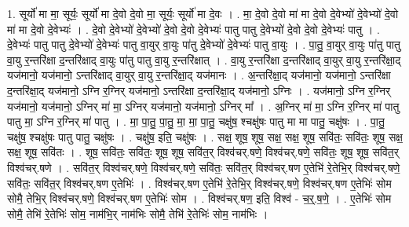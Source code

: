 \documentclass[17pt]{extarticle}
\begin{document}
1. सूर्यो॑ मा मा॒ सूर्यः॒ सूर्यो॑ मा दे॒वो दे॒वो मा॒ सूर्यः॒ सूर्यो॑ मा दे॒वः । . मा॒ दे॒वो दे॒वो मा॑ मा दे॒वो दे॒वेभ्यो॑ दे॒वेभ्यो॑ दे॒वो मा॑ मा दे॒वो दे॒वेभ्यः॑ । . दे॒वो दे॒वेभ्यो॑ दे॒वेभ्यो॑ दे॒वो दे॒वो दे॒वेभ्यः॑ पातु पातु दे॒वेभ्यो॑ दे॒वो दे॒वो दे॒वेभ्यः॑ पातु । . दे॒वेभ्यः॑ पातु पातु दे॒वेभ्यो॑ दे॒वेभ्यः॑ पातु वा॒युर् वा॒युः पा॑तु दे॒वेभ्यो॑ दे॒वेभ्यः॑ पातु वा॒युः । . पा॒तु॒ वा॒युर् वा॒युः पा॑तु पातु वा॒यु र॒न्तरि॑क्षा द॒न्तरि॑क्षाद् वा॒युः पा॑तु पातु वा॒यु र॒न्तरि॑क्षात् । . वा॒यु र॒न्तरि॑क्षा द॒न्तरि॑क्षाद् वा॒युर् वा॒यु र॒न्तरि॑क्षा॒द् यज॑मानो॒ यज॑मानो॒ ऽन्तरि॑क्षाद् वा॒युर् वा॒यु र॒न्तरि॑क्षा॒द् यज॑मानः । . अ॒न्तरि॑क्षा॒द् यज॑मानो॒ यज॑मानो॒ ऽन्तरि॑क्षा द॒न्तरि॑क्षा॒द् यज॑मानो॒ ऽग्नि र॒ग्निर् यज॑मानो॒ ऽन्तरि॑क्षा द॒न्तरि॑क्षा॒द् यज॑मानो॒ ऽग्निः । . यज॑मानो॒ ऽग्नि र॒ग्निर् यज॑मानो॒ यज॑मानो॒ ऽग्निर् मा॑ मा॒ ऽग्निर् यज॑मानो॒ यज॑मानो॒ ऽग्निर् मा᳚ । . अ॒ग्निर् मा॑ मा॒ ऽग्नि र॒ग्निर् मा॑ पातु पातु मा॒ ऽग्नि र॒ग्निर् मा॑ पातु । . मा॒ पा॒तु॒ पा॒तु॒ मा॒ मा॒ पा॒तु॒ चक्षु॑ष॒ श्चक्षु॑षः पातु मा मा पातु॒ चक्षु॑षः । . पा॒तु॒ चक्षु॑ष॒ श्चक्षु॑षः पातु पातु॒ चक्षु॑षः । . चक्षु॑ष॒ इति॒ चक्षु॑षः । . सक्ष॒ शूष॒ शूष॒ सक्ष॒ सक्ष॒ शूष॒ सवि॑तः॒ सवि॑तः॒ शूष॒ सक्ष॒ सक्ष॒ शूष॒ सवि॑तः । . शूष॒ सवि॑तः॒ सवि॑तः॒ शूष॒ शूष॒ सवि॑त॒र् विश्व॑चर्.षणे॒ विश्व॑चर्.षणे॒ सवि॑तः॒ शूष॒ शूष॒ सवि॑त॒र् विश्व॑चर्.षणे । . सवि॑त॒र् विश्व॑चर्.षणे॒ विश्व॑चर्.षणे॒ सवि॑तः॒ सवि॑त॒र् विश्व॑चर्.षण ए॒तेभि॑ रे॒तेभि॒र् विश्व॑चर्.षणे॒ सवि॑तः॒ सवि॑त॒र् विश्व॑चर्.षण ए॒तेभिः॑ । . विश्व॑चर्.षण ए॒तेभि॑ रे॒तेभि॒र् विश्व॑चर्.षणे॒ विश्व॑चर्.षण ए॒तेभिः॑ सोम सोमै॒ तेभि॒र् विश्व॑चर्.षणे॒ विश्व॑चर्.षण ए॒तेभिः॑ सोम । . विश्व॑चर्.षण॒ इति॒ विश्व॑ - च॒र्॒.ष॒णे॒ । . ए॒तेभिः॑ सोम सोमै॒ तेभि॑ रे॒तेभिः॑ सोम॒ नाम॑भि॒र् नाम॑भिः सोमै॒ तेभि॑ रे॒तेभिः॑ सोम॒ नाम॑भिः । \newline
\end{document}
